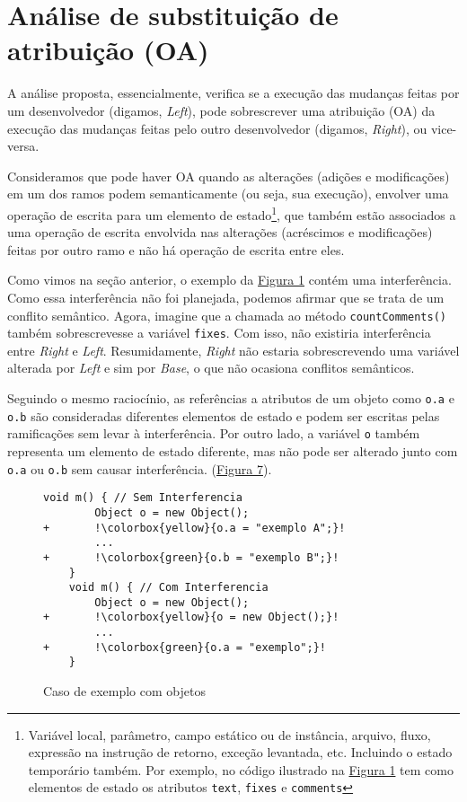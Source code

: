 \section{Análise de substituição de atribuição (OA)}

A análise proposta, essencialmente, verifica se a execução das mudanças feitas por um desenvolvedor (digamos, \emph{Left}), pode sobrescrever uma atribuição (OA) da execução das mudanças feitas pelo outro desenvolvedor (digamos, \emph{Right}), ou vice-versa.

Consideramos que pode haver OA quando as alterações (adições e modificações) em um dos ramos podem semanticamente (ou seja, sua execução), envolver uma operação de escrita para um elemento de estado\footnote{Variável local, parâmetro, campo estático ou de instância, arquivo, fluxo, expressão na instrução de retorno, exceção levantada, etc. Incluindo o estado temporário também. Por exemplo, no código ilustrado na \hyperref[fig:codigo-motivador]{Figura 1} tem como elementos de estado os atributos \texttt{text}, \texttt{fixes} e \texttt{comments}}, que também estão associados a uma operação de escrita envolvida nas alterações (acréscimos e modificações) feitas por outro ramo e não há operação de escrita entre eles. 

Como vimos na seção anterior, o exemplo da \hyperref[fig:codigo-motivador]{Figura 1} contém uma interferência. Como essa interferência não foi planejada, podemos afirmar que se trata de um conflito semântico. Agora, imagine que a chamada ao método \texttt{countComments()} também sobrescrevesse a variável \texttt{fixes}. Com isso, não existiria interferência entre \emph{Right} e \emph{Left}. Resumidamente, \emph{Right} não estaria sobrescrevendo uma variável alterada por \emph{Left} e sim por \emph{Base}, o que não ocasiona conflitos semânticos.

Seguindo o mesmo raciocínio, as referências a atributos de um objeto como \texttt{o.a} e \texttt{o.b} são consideradas diferentes elementos de estado e podem ser escritas pelas ramificações sem levar à interferência. Por outro lado, a variável \texttt{o} também representa um elemento de estado diferente, mas não pode ser alterado junto com \texttt{o.a} ou \texttt{o.b} sem causar interferência. (\hyperref[fig:object-samples]{Figura 7}).


\begin{figure}[h]
    \begin{lstlisting}[escapechar=!]
    void m() { // Sem Interferencia
        Object o = new Object();
+       !\colorbox{yellow}{o.a = "exemplo A";}!
        ...
+       !\colorbox{green}{o.b = "exemplo B";}!
    }
    void m() { // Com Interferencia
        Object o = new Object();
+       !\colorbox{yellow}{o = new Object();}!
        ...
+       !\colorbox{green}{o.a = "exemplo";}!
    }
    \end{lstlisting}
    \caption{Caso de exemplo com objetos}
    \label{fig:object-samples}
\end{figure}

